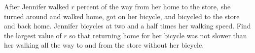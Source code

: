 After Jennifer walked $r$ percent of the way from her home to the store, she turned around and walked home, got on her bicycle, and bicycled to the store and back home. Jennifer bicycles at two and a half times her walking speed. Find the largest value of $r$ so that returning home for her bicycle was not slower than her walking all the way to and from the store without her bicycle.
